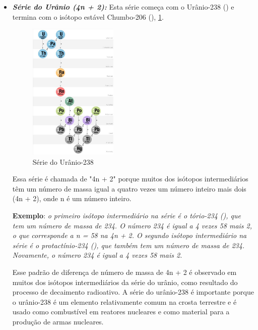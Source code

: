 \documentclass[11pt,a4paper]{article}
\begin{document}
\begin{itemize}
                    \item \textbf{\textit{\textcolor{CarnationPink}{Série do Urânio (4n + 2):}}} Esta série começa com o Urânio-238 () e termina com o isótopo estável Chumbo-206 (), \ref{fig:serieDoUranio}. 
                    
                            \begin{figure}[h]
                                \centering
                                \includegraphics[width=0.4\textwidth]{Imagens/serieDoUranio.jpg}
                                \caption{Série do Urânio-238}
                                \label{fig:serieDoUranio}
                            \end{figure}
                    
                        
                        Essa série é chamada de "4n + 2" porque muitos dos isótopos intermediários têm um número de massa igual a quatro vezes um número inteiro mais dois (4n + 2), onde n é um número inteiro.

                        \textbf{Exemplo}: \textit{o primeiro isótopo intermediário na série é o tório-234 (), que tem um número de massa de 234. O número 234 é igual a 4 vezes 58 mais 2, o que corresponde a n = 58 na  4n + 2. O segundo isótopo intermediário na série é o protactínio-234 (), que também tem um número de massa de 234. Novamente, o número 234 é igual a 4 vezes 58 mais 2.}
                    
                        Esse padrão de diferença de número de massa de 4n + 2 é observado em muitos dos isótopos intermediários da série do urânio, como resultado do processo de decaimento radioativo. A série do urânio-238 é importante porque o urânio-238 é um elemento relativamente comum na crosta terrestre e é usado como combustível em reatores nucleares e como material para a produção de armas nucleares.



\end{itemize}
\end{document}
